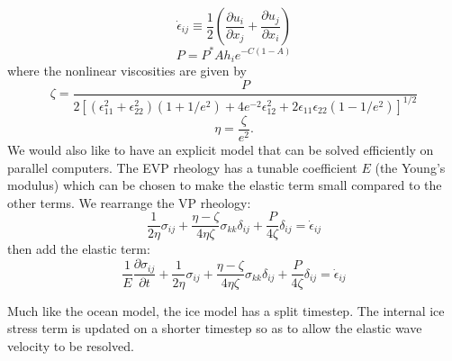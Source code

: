 \begin{equation}
  \dot \epsilon_{ij} \equiv \frac{1 }{ 2} \left( \frac{\partial u_i
  }{
  \partial x_j} + \frac{\partial u_j }{ \partial x_i} \right)
\end{equation}
\begin{equation}
  P = P^* A h_i e^{-C(1-A)}
\end{equation}
where the nonlinear viscosities are given by
\begin{equation}
\zeta = \frac{ P }{ 2 \left[ (\epsilon^2_{11} +
   \epsilon^2_{22} ) ( 1 + 1/e^2 ) + 4 e^{-2} \epsilon^2_{12}
      + 2 \epsilon_{11} \epsilon_{22} ( 1 - 1/e^2 ) \right] ^{1/2} }
\end{equation}
\begin{equation}
      \eta = \frac{ \zeta }{ e^2 }.
\end{equation}
We would also like to have an explicit model that can be solved
efficiently on parallel computers. The EVP rheology has a tunable
coefficient $E$ (the Young's modulus) which can be chosen to make
the elastic term small compared to the other terms. We rearrange the VP
rheology:
\begin{equation}
  \frac{1 }{ 2 \eta} \sigma_{ij} + \frac{\eta - \zeta }{ 4 \eta \zeta}
  \sigma_{kk} \delta_{ij} + \frac{P }{ 4 \zeta} \delta_{ij} = \dot
  \epsilon_{ij}
\end{equation}
then add the elastic term:
\begin{equation}
  \frac{1 }{ E} \frac{\partial \sigma_{ij} }{ \partial t} +
  \frac{1 }{ 2
  \eta} \sigma_{ij} + \frac{\eta - \zeta }{ 4 \eta \zeta} \sigma_{kk}
  \delta_{ij} + \frac{P }{ 4 \zeta} \delta_{ij} = \dot \epsilon_{ij}
\end{equation}

Much like the ocean model, the ice model has a split timestep. The
internal ice stress term is updated on a shorter timestep so as to
allow the elastic wave velocity to be resolved.

